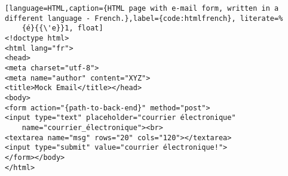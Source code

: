 

\begin{lstlisting}[language=HTML,caption={HTML page with e-mail form, written in a different language - French.},label={code:htmlfrench}, literate=%
	{é}{{\'e}}1, float]
<!doctype html>
<html lang="fr">
<head>
<meta charset="utf-8">
<meta name="author" content="XYZ">
<title>Mock Email</title></head>
<body>
<form action="{path-to-back-end}" method="post">
<input type="text" placeholder="courrier électronique"
	name="courrier_électronique"><br>
<textarea name="msg" rows="20" cols="120"></textarea>
<input type="submit" value="courrier électronique!">
</form></body>
</html>
\end{lstlisting}
